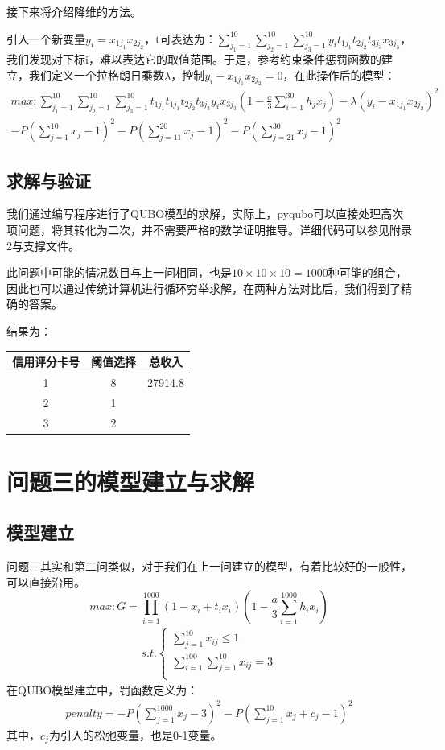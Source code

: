 \documentclass{MathorCupmodeling}
\begin{document}
接下来将介绍降维的方法。

引入一个新变量$y_{i}=x_{1j_{1}}x_{2j_{2}}$，t可表达为：$\sum_{j_{1}=1}^{10}\sum_{j_{2}=1}^{10}\sum_{j_{3}=1}^{10}y_{i}t_{1j_{1}}t_{2j_{2}}t_{3j_{3}}x_{3j_{3}}$，我们发现对下标i，难以表达它的取值范围。于是，参考约束条件惩罚函数的建立，我们定义一个拉格朗日乘数$\lambda$，控制$y_{i}-x_{1j_{1}}x_{2j_{2}}=0$，在此操作后的模型：
\begin{gather}
max:\sum_{j_{1}=1}^{10}\sum_{j_{2}=1}^{10}\sum_{j_{3}=1}^{10}t_{1j_{1}}t_{1j_{1}}t_{2j_{2}}t_{3j_{3}}y_{i}x_{3j_{3}}(1-\frac{a}{3}\sum_{i=1}^{30}h_{j}x_{j})-\lambda(y_{i}-x_{1j_{1}}x_{2j_{2}})^2\\
-P(\sum_{j=1}^{10}x_{j} -1)^{2}-P(\sum_{j=11}^{20}x_{j} -1)^{2}-P(\sum_{j=21}^{30}x_{j} -1)^{2}
\end{gather}
\subsection{求解与验证}
我们通过编写程序进行了QUBO模型的求解，实际上，pyqubo可以直接处理高次项问题，将其转化为二次，并不需要严格的数学证明推导。详细代码可以参见附录2与支撑文件。

此问题中可能的情况数目与上一问相同，也是$10\times10\times10=1000$种可能的组合，因此也可以通过传统计算机进行循环穷举求解，在两种方法对比后，我们得到了精确的答案。

结果为：
 \begin{center}
 \begin{tabular}{ccc}
   \toprule
   信用评分卡号 & 阈值选择 & 总收入  \\
   \midrule
   1 & 8 & 27914.8 \\
   2 & 1 & \\
   3 & 2 & \\
    \bottomrule
   \end{tabular}
   \end{center}
   \section{问题三的模型建立与求解}
   \subsection{模型建立}
   问题三其实和第二问类似，对于我们在上一问建立的模型，有着比较好的一般性，可以直接沿用。
   $$
max:G=\prod_{i=1}^{1000}(1-x_{i}+t_{i}x_{i})(1-\frac{a}{3}\sum_{i=1}^{1000}h_{i}x_{i})
$$
\begin{gather}
s.t.
\left\{
\begin{aligned}
\sum_{j=1}^{10}x_{ij} \le 1   \\
\sum_{i=1}^{100}\sum_{j=1}^{10}x_{ij} =3 \\
\end{aligned}
\right.
\end{gather} 
在QUBO模型建立中，罚函数定义为：
$$
\begin{aligned}
penalty = -P(\sum_{j=1}^{1000}x_{j} -3)^{2}-P(\sum_{j=1}^{10}x_{j}+c_{j} -1)^{2}
\end{aligned}
$$
其中，$c_{j}$为引入的松弛变量，也是0-1变量。
\end{document}
